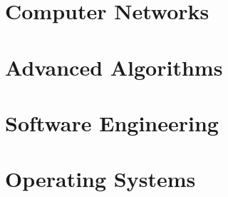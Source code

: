 \part{Computer Networks}


\part{Advanced Algorithms}




\part{Software Engineering}


\part{Operating Systems}

